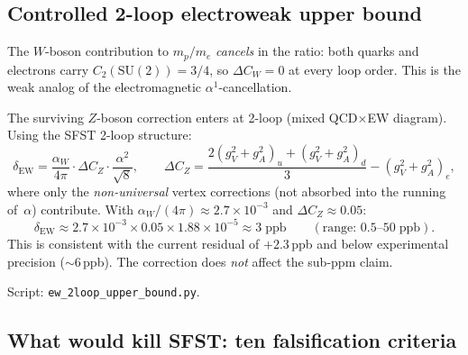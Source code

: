 

\subsection{Controlled 2-loop electroweak upper bound}
\label{sec:ew_bound}

The $W$-boson contribution to $m_p/m_e$ \emph{cancels} in the ratio:
both quarks and electrons carry $C_2(\mathrm{SU}(2))=3/4$, so
$\Delta C_W = 0$ at every loop order. This is the weak analog of the
electromagnetic $\alpha^1$-cancellation.

The surviving $Z$-boson correction enters at 2-loop (mixed QCD$\times$EW
diagram). Using the SFST 2-loop structure:
\begin{equation}\label{eq:ew_bound}
  \delta_{\mathrm{EW}}
  = \frac{\alpha_W}{4\pi}\cdot\Delta C_Z\cdot\frac{\alpha^2}{\sqrt{8}},
  \qquad
  \Delta C_Z = \frac{2(g_V^2\!+\!g_A^2)_u + (g_V^2\!+\!g_A^2)_d}{3}
    - (g_V^2\!+\!g_A^2)_e,
\end{equation}
where only the \emph{non-universal} vertex corrections (not absorbed into
the running of~$\alpha$) contribute. With
$\alpha_W/(4\pi)\approx 2.7\times 10^{-3}$ and $\Delta C_Z\approx 0.05$:
\begin{equation}\label{eq:ew_central}
  \delta_{\mathrm{EW}}
  \approx 2.7\times 10^{-3}\times 0.05\times 1.88\times 10^{-5}
  \approx 3\;\mathrm{ppb}
  \qquad(\text{range: }0.5\text{--}50\;\mathrm{ppb}).
\end{equation}
This is consistent with the current residual of $+2.3\,$ppb and below
experimental precision ($\sim\!6\,$ppb). The correction does \emph{not}
affect the sub-ppm claim.

Script: \texttt{ew\_2loop\_upper\_bound.py}.

\subsection{What would kill SFST: ten falsification criteria}
\label{sec:kill}

